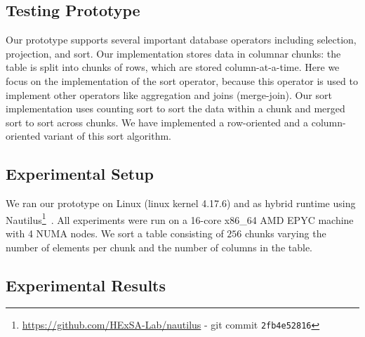 \documentclass[conference]{IEEEtran}
\begin{document}
\subsection{Testing Prototype}
\label{sec:testing-prototype}

Our prototype supports several important database operators including selection, projection, and sort. Our implementation stores data in columnar chunks: the table is split into chunks of rows, which are stored column-at-a-time. Here we focus on the implementation of the sort operator, because this operator is used to implement other operators like aggregation and joins (merge-join). Our sort implementation uses counting sort to sort the data within a chunk and merged sort to sort across chunks. We have implemented a row-oriented and a column-oriented variant of this sort algorithm.

\subsection{Experimental Setup}
\label{sec:experimental-setup}

We ran our prototype on Linux (linux kernel 4.17.6) and as hybrid runtime using Nautilus\footnote{\url{https://github.com/HExSA-Lab/nautilus} - git commit \texttt{2fb4e52816}}~\cite{HALE:2015:NAUTILUS,HALE:2016:HRTHVM}. 
All experiments were run on a 16-core x86\_64 AMD EPYC machine with 4 NUMA nodes.
We sort a table consisting of $256$ chunks varying the number of elements per chunk and the number of columns in the table.

\subsection{Experimental Results}
\label{sec:experimental-results}
\end{document}
